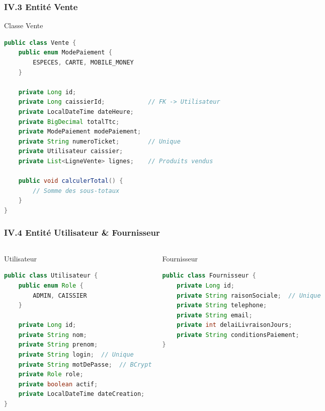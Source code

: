 \documentclass[11pt, aspectratio=169]{beamer}
\begin{document}
\begin{frame}
    \frametitle{IV.3 Entité Vente}
    
    \begin{block}{Classe Vente}
        \begin{lstlisting}[language=Java]
public class Vente {
    public enum ModePaiement {
        ESPECES, CARTE, MOBILE_MONEY
    }
    
    private Long id;
    private Long caissierId;            // FK -> Utilisateur
    private LocalDateTime dateHeure;
    private BigDecimal totalTtc;
    private ModePaiement modePaiement;
    private String numeroTicket;        // Unique
    private Utilisateur caissier;
    private List<LigneVente> lignes;    // Produits vendus
    
    public void calculerTotal() {
        // Somme des sous-totaux
    }
}
        \end{lstlisting}
    \end{block}
\end{frame}

\begin{frame}
    \frametitle{IV.4 Entité Utilisateur \& Fournisseur}
    
    \begin{columns}[T]
        \begin{block}{Utilisateur}
            \begin{lstlisting}[language=Java, basicstyle=\ttfamily\tiny]
public class Utilisateur {
    public enum Role {
        ADMIN, CAISSIER
    }
    
    private Long id;
    private String nom;
    private String prenom;
    private String login;  // Unique
    private String motDePasse;  // BCrypt
    private Role role;
    private boolean actif;
    private LocalDateTime dateCreation;
}
            \end{lstlisting}
        \end{block}
        
        \begin{block}{Fournisseur}
            \begin{lstlisting}[language=Java, basicstyle=\ttfamily\tiny]
public class Fournisseur {
    private Long id;
    private String raisonSociale;  // Unique
    private String telephone;
    private String email;
    private int delaiLivraisonJours;
    private String conditionsPaiement;
}
            \end{lstlisting}
        \end{block}
    \end{columns}
\end{frame}
\end{document}
